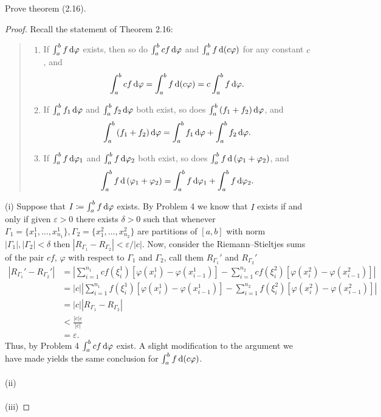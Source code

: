 \begin{problem}
  Prove theorem (2.16).
\end{problem}
\begin{proof}
  Recall the statement of Theorem 2.16:
  \begin{quote}
    \begin{enumerate}[label=(\roman*),noitemsep]
    \item If $\int_a^b f\mathop{}\!\mathrm{d}\varphi$ exists, then so do
      $\int_a^bcf\mathop{}\!\mathrm{d}\varphi$ and $\int_a^b f\mathop{}\!\mathrm{d}(c\varphi)$ for any
      constant $c$, and
      \[
        \int_a^bcf\mathop{}\!\mathrm{d}\varphi=\int_a^bf\mathop{}\!\mathrm{d}(c\varphi)=c\int_a^bf\mathop{}\!\mathrm{d}\varphi.
      \]
    \item If $\int_a^b f_1\mathop{}\!\mathrm{d}\varphi$ and $\int_a^bf_2\mathop{}\!\mathrm{d}\varphi$ both
      exist, so does $\int_a^b\left(f_1+f_2\right)\mathop{}\!\mathrm{d}\varphi$, and
      \[
        \int_a^b\left(f_1+f_2\right)\mathop{}\!\mathrm{d}\varphi=\int_a^bf_1\mathop{}\!\mathrm{d}\varphi+\int_a^bf_2\mathop{}\!\mathrm{d}\varphi.
      \]
    \item If $\int_a^bf\mathop{}\!\mathrm{d}\varphi_1$ and $\int_a^bf\mathop{}\!\mathrm{d}\varphi_2$ both
      exist, so does $\int_a^bf\mathop{}\!\mathrm{d}\left(\varphi_1+\varphi_2\right)$, and
      \[
        \int_a^bf\mathop{}\!\mathrm{d}\left(\varphi_1+\varphi_2\right)=\int_a^bf\mathop{}\!\mathrm{d}\varphi_1+\int_a^bf\mathop{}\!\mathrm{d}\varphi_2.
      \]
    \end{enumerate}
  \end{quote}
  \noindent%
  (i) Suppose that $I\coloneq\int_a^bf\mathop{}\!\mathrm{d}\varphi$ exists. By Problem 4 we
  know that $I$ exists if and only if given $\varepsilon>0$ there exists
  $\delta>0$ such that whenever
  $\Gamma_1=\{x_1^1,\ldots,x_{n_1}^1\},\Gamma_2=\{x_1^2,\ldots,x_{n_2}^2\}$
  are partitions of $[a,b]$ with norm $|\Gamma_1|,|\Gamma_2|<\delta$ then
  $|R_{\Gamma_1}-R_{\Gamma_2}|<\varepsilon/|c|$. Now, consider the
  Riemann--Stieltjes sums of the pair $cf$, $\varphi$ with respect to
  $\Gamma_1$ and $\Gamma_2$, call them $R_{\Gamma_1}'$ and $R_{\Gamma_2}'$
  \begin{align*}
    |R_{\Gamma_1}'-R_{\Gamma_2}'|
    &=\left|\sum_{i=1}^{n_1}cf(\xi_i^1)\left[\varphi(x_i^1)-\varphi(x_{i-1}^1)\right]
      -\sum_{i=1}^{n_2}cf(\xi_i^2)\left[\varphi(x_i^2)-\varphi(x_{i-1}^2)\right]\right|\\
    &=|c|\left|\sum_{i=1}^{n_1}f(\xi_i^1)\left[\varphi(x_i^1)-\varphi(x_{i-1}^1)\right]
      -\sum_{i=1}^{n_2}f(\xi_i^2)\left[\varphi(x_i^2)-\varphi(x_{i-1}^2)\right]\right|\\
    &=|c||R_{\Gamma_1}-R_{\Gamma_2}|\\
    &<\frac{|c|\varepsilon}{|c|}\\
    &=\varepsilon.
  \end{align*}
  Thus, by Problem 4 $\int_a^b cf\mathop{}\!\mathrm{d}\varphi$ exist. A slight modification
  to the argument we have made yields the same conclusion for
  $\int_a^b f\mathop{}\!\mathrm{d}(c\varphi)$.
  \\\\
  (ii)
  \\\\
  (iii)
\end{proof}

